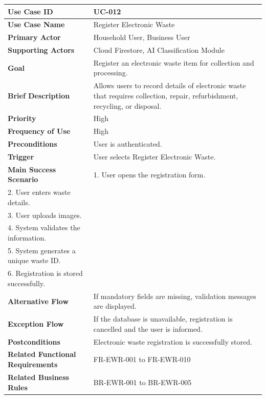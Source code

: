 \begin{longtable}{|p{4cm}|p{10cm}|}

\hline
\textbf{Use Case ID} &
UC-012 \\
\hline

\textbf{Use Case Name} &
Register Electronic Waste \\
\hline

\textbf{Primary Actor} &
Household User, Business User \\
\hline

\textbf{Supporting Actors} &
Cloud Firestore, AI Classification Module \\
\hline

\textbf{Goal} &
Register an electronic waste item for collection and processing. \\
\hline

\textbf{Brief Description} &
Allows users to record details of electronic waste that requires
collection, repair, refurbishment, recycling, or disposal. \\
\hline

\textbf{Priority} &
High \\
\hline

\textbf{Frequency of Use} &
High \\
\hline

\textbf{Preconditions} &
User is authenticated. \\
\hline

\textbf{Trigger} &
User selects Register Electronic Waste. \\
\hline

\textbf{Main Success Scenario} &
1. User opens the registration form.\\
2. User enters waste details.\\
3. User uploads images.\\
4. System validates the information.\\
5. System generates a unique waste ID.\\
6. Registration is stored successfully.\\
\hline

\textbf{Alternative Flow} &
If mandatory fields are missing, validation messages are displayed.\\
\hline

\textbf{Exception Flow} &
If the database is unavailable, registration is cancelled and the user
is informed.\\
\hline

\textbf{Postconditions} &
Electronic waste registration is successfully stored.\\
\hline

\textbf{Related Functional Requirements} &
FR-EWR-001 to FR-EWR-010 \\
\hline

\textbf{Related Business Rules} &
BR-EWR-001 to BR-EWR-005 \\
\hline

\end{longtable}

